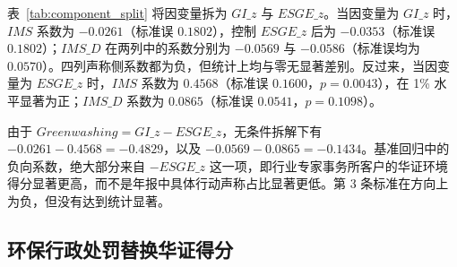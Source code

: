 \documentclass[12pt,a4paper]{article}
\begin{document}
表~\ref{tab:component_split} 将因变量拆为 $GI\_z$ 与 $ESGE\_z$。当因变量为 $GI\_z$ 时，$IMS$ 系数为 $-0.0261$（标准误 $0.1802$），控制 $ESGE\_z$ 后为 $-0.0353$（标准误 $0.1802$）；$IMS\_D$ 在两列中的系数分别为 $-0.0569$ 与 $-0.0586$（标准误均为 $0.0570$）。四列声称侧系数都为负，但统计上均与零无显著差别。反过来，当因变量为 $ESGE\_z$ 时，$IMS$ 系数为 $0.4568$（标准误 $0.1600$，$p=0.0043$），在 1\% 水平显著为正；$IMS\_D$ 系数为 $0.0865$（标准误 $0.0541$，$p=0.1098$）。

由于 $Greenwashing=GI\_z-ESGE\_z$，无条件拆解下有 $-0.0261-0.4568=-0.4829$，以及 $-0.0569-0.0865=-0.1434$。基准回归中的负向系数，绝大部分来自 $-ESGE\_z$ 这一项，即行业专家事务所客户的华证环境得分显著更高，而不是年报中具体行动声称占比显著更低。第 3 条标准在方向上为负，但没有达到统计显著。

\begin{table}[htbp]
\centering
\caption{沟通侧与绩效侧成分拆解}
\label{tab:component_split}
\renewcommand{\arraystretch}{1.25}
\end{table}

\subsection{环保行政处罚替换华证得分}
\end{document}
